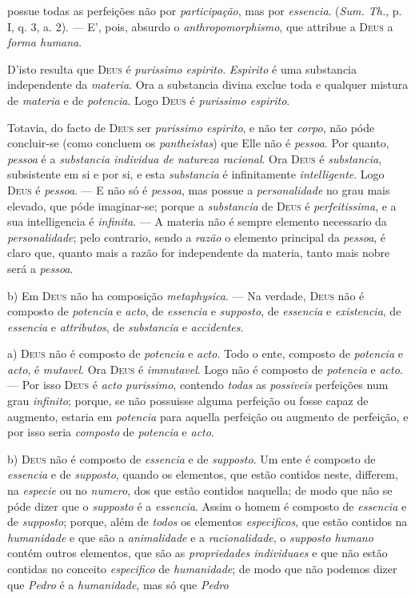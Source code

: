 possue todas as perfeições não por \emph{participação}, mas por \emph{essencia}. (\emph{Sum. Th.}, p. I, q. 3, a. 2). --- E', pois, absurdo o \emph{anthropomorphismo}, que attribue a \textsc{Deus} a \emph{forma humana}.\par D'isto resulta que \textsc{Deus} é \emph{purissimo espirito}. \emph{Espirito} é uma substancia independente da \emph{materia}. Ora a substancia divina exclue toda e qualquer mistura de \emph{materia} e de \emph{potencia}. Logo \textsc{Deus} é \emph{purissimo espirito}.\par Totavia, do facto de \textsc{Deus} ser \emph{purissimo espirito}, e não ter \emph{corpo}, não póde concluir-se (como concluem os \emph{pantheistas}) que Elle não é \emph{pessoa}. Por quanto, \emph{pessoa} é a \emph{substancia individua de natureza racional}. Ora \textsc{Deus} é \emph{substancia}, subsistente em si e por si, e esta \emph{substancia} é infinitamente \emph{intelligente}. Logo \textsc{Deus} é \emph{pessoa}. --- E não só é \emph{pessoa}, mas possue a \emph{personalidade} no grau mais elevado, que póde imaginar-se; porque a \emph{substancia} de \textsc{Deus} é \emph{perfeitissima}, e a sua intelligencia é \emph{infinita}. --- A materia não é sempre elemento necessario da \emph{personalidade}; pelo contrario, sendo a \emph{razão} o elemento principal da \emph{pessoa}, é claro que, quanto mais a razão for independente da materia, tanto mais nobre será a \emph{pessoa}.\par b) Em \textsc{Deus} não ha composição \emph{metaphysica}. --- Na verdade, \textsc{Deus} não é composto de \emph{potencia} e \emph{acto}, de \emph{essencia} e \emph{supposto}, de \emph{essencia} e \emph{existencia}, de \emph{essencia} e \emph{attributos}, de \emph{substancia} e \emph{accidentes}.\par a) \textsc{Deus} não é composto de \emph{potencia} e \emph{acto}. Todo o ente, composto de \emph{potencia} e \emph{acto}, é \emph{mutavel}. Ora \textsc{Deus} é \emph{immutavel}. Logo não é composto de \emph{potencia} e \emph{acto}. --- Por isso \textsc{Deus} é \emph{acto purissimo}, contendo \emph{todas} as \emph{possiveis} perfeições num grau \emph{infinito}; porque, se não possuisse alguma perfeição ou fosse capaz de augmento, estaria em \emph{potencia} para aquella perfeição ou augmento de perfeição, e por isso seria \emph{composto} de \emph{potencia} e \emph{acto}.\par b) \textsc{Deus} não é composto de \emph{essencia} e de \emph{supposto}. Um ente é composto de \emph{essencia} e de \emph{supposto}, quando os elementos, que estão contidos neste, differem, na \emph{especie} ou no \emph{numero}, dos que estão contidos naquella; de modo que não se póde dizer que o \emph{supposto} é a \emph{essencia}. Assim o homem é composto de \emph{essencia} e de \emph{supposto}; porque, além de \emph{todos} os elementos \emph{especificos}, que estão contidos na \emph{humanidade} e que são a \emph{animalidade} e a \emph{racionalidade}, o \emph{supposto humano} contém outros elementos, que são as \emph{propriedades individuaes} e que não estão contidas no conceito \emph{especifico} de \emph{humanidade}; de modo que não podemos dizer que \emph{Pedro} é a \emph{humanidade}, mas só que \emph{Pedro} 